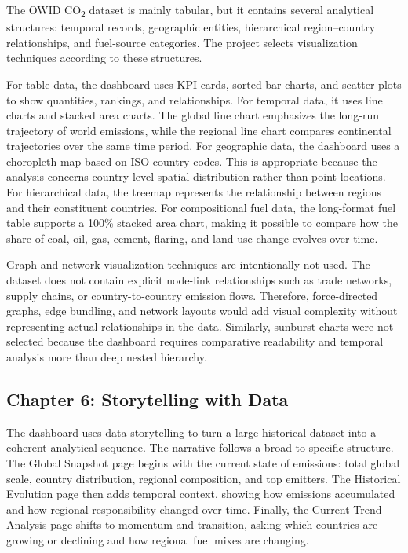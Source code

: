 \documentclass[a4paper,12pt]{article}
\begin{document}
The OWID CO\textsubscript{2} dataset is mainly tabular, but it contains several analytical
structures: temporal records, geographic entities, hierarchical region--country
relationships, and fuel-source categories. The project selects visualization techniques
according to these structures.

For table data, the dashboard uses KPI cards, sorted bar charts, and scatter plots to
show quantities, rankings, and relationships. For temporal data, it uses line charts and
stacked area charts. The global line chart emphasizes the long-run trajectory of world
emissions, while the regional line chart compares continental trajectories over the same
time period. For geographic data, the dashboard uses a choropleth map based on ISO country
codes. This is appropriate because the analysis concerns country-level spatial
distribution rather than point locations. For hierarchical data, the treemap represents
the relationship between regions and their constituent countries. For compositional fuel
data, the long-format fuel table supports a 100\% stacked area chart, making it possible
to compare how the share of coal, oil, gas, cement, flaring, and land-use change evolves
over time.

Graph and network visualization techniques are intentionally not used. The dataset does
not contain explicit node-link relationships such as trade networks, supply chains, or
country-to-country emission flows. Therefore, force-directed graphs, edge bundling, and
network layouts would add visual complexity without representing actual relationships in
the data. Similarly, sunburst charts were not selected because the dashboard requires
comparative readability and temporal analysis more than deep nested hierarchy.

\subsection{Chapter 6: Storytelling with Data}

The dashboard uses data storytelling to turn a large historical dataset into a coherent
analytical sequence. The narrative follows a broad-to-specific structure. The Global
Snapshot page begins with the current state of emissions: total global scale, country
distribution, regional composition, and top emitters. The Historical Evolution page then
adds temporal context, showing how emissions accumulated and how regional responsibility
changed over time. Finally, the Current Trend Analysis page shifts to momentum and
transition, asking which countries are growing or declining and how regional fuel mixes
are changing.
\end{document}
